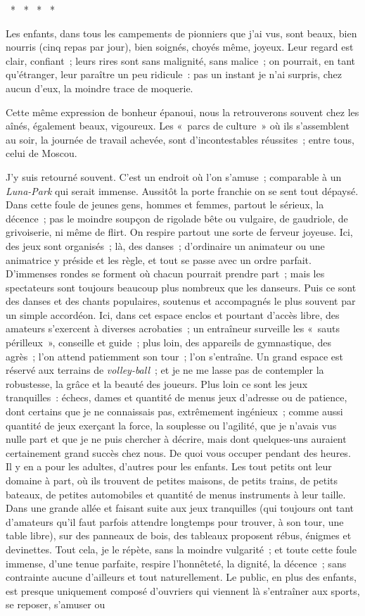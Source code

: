 \documentclass[french,twoside]{book} %
\begin{document}
{\centering \noindent *  *  *  *  *\par}
\noindent Les enfants, dans tous les campements de pionniers que j’ai vus, sont beaux, bien nourris (cinq repas par jour), bien soignés, choyés même, joyeux. Leur regard est clair, confiant ; leurs rires sont sans malignité, sans malice ; on pourrait, en tant qu’étranger, leur paraître un peu ridicule : pas un instant je n’ai surpris, chez aucun d’eux, la moindre trace de moquerie.\par
Cette même expression de bonheur épanoui, nous la retrouverons souvent chez les aînés, également beaux, vigoureux. Les « parcs de culture » où ils s’assemblent au soir, la journée de travail achevée, sont d’incontestables réussites ; entre tous, celui de Moscou.\par
J’y suis retourné souvent. C’est un endroit où l’on s’amuse ; comparable à un \emph{Luna-Park} qui serait immense. Aussitôt la porte franchie on se sent tout dépaysé. Dans cette foule de jeunes gens, hommes et femmes, partout le sérieux, la décence ; pas le moindre soupçon de rigolade bête ou vulgaire, de gaudriole, de grivoiserie, ni même de flirt. On respire partout une sorte de ferveur joyeuse. Ici, des jeux sont organisés ; là, des danses ; d’ordinaire un animateur ou une animatrice y préside et les règle, et tout se passe avec un ordre parfait. D’immenses rondes se forment où chacun pourrait prendre part ; mais les spectateurs sont toujours beaucoup plus nombreux que les danseurs. Puis ce sont des danses et des chants populaires, soutenus et accompagnés le plus souvent par un simple accordéon. Ici, dans cet espace enclos et pourtant d’accès libre, des amateurs s’exercent à diverses acrobaties ; un entraîneur surveille les « sauts périlleux », conseille et guide ; plus loin, des appareils de gymnastique, des agrès ; l’on attend patiemment son tour ; l’on s’entraîne. Un grand espace est réservé aux terrains de \emph{volley-ball} ; et je ne me lasse pas de contempler la robustesse, la grâce et la beauté des joueurs. Plus loin ce sont les jeux tranquilles : échecs, dames et quantité de menus jeux d’adresse ou de patience, dont certains que je ne connaissais pas, extrêmement ingénieux ; comme aussi quantité de jeux exerçant la force, la souplesse ou l’agilité, que je n’avais vus nulle part et que je ne puis chercher à décrire, mais dont quelques-uns auraient certainement grand succès chez nous. De quoi vous occuper pendant des heures. Il y en a pour les adultes, d’autres pour les enfants. Les tout petits ont leur domaine à part, où ils trouvent de petites maisons, de petits trains, de petits bateaux, de petites automobiles et quantité de menus instruments à leur taille. Dans une grande allée et faisant suite aux jeux tranquilles (qui toujours ont tant d’amateurs qu’il faut parfois attendre longtemps pour trouver, à son tour, une table libre), sur des panneaux de bois, des tableaux proposent rébus, énigmes et devinettes. Tout cela, je le répète, sans la moindre vulgarité ; et toute cette foule immense, d’une tenue parfaite, respire l’honnêteté, la dignité, la décence ; sans contrainte aucune d’ailleurs et tout naturellement. Le public, en plus des enfants, est presque uniquement composé d’ouvriers qui viennent là s’entraîner aux sports, se reposer, s’amuser ou 
\end{document}
